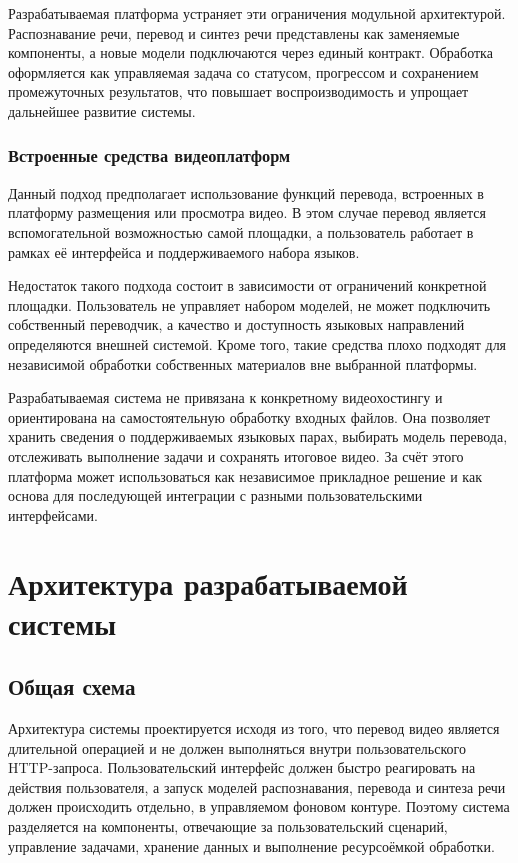 \documentclass[a4paper,article,14pt]{extarticle}
\begin{document}
Разрабатываемая платформа устраняет эти ограничения модульной архитектурой. Распознавание речи, перевод и синтез речи представлены как заменяемые компоненты, а новые модели подключаются через единый контракт. Обработка оформляется как управляемая задача со статусом, прогрессом и сохранением промежуточных результатов, что повышает воспроизводимость и упрощает дальнейшее развитие системы.

\subsubsection{Встроенные средства видеоплатформ}

Данный подход предполагает использование функций перевода, встроенных в платформу размещения или просмотра видео. В этом случае перевод является вспомогательной возможностью самой площадки, а пользователь работает в рамках её интерфейса и поддерживаемого набора языков.

Недостаток такого подхода состоит в зависимости от ограничений конкретной площадки. Пользователь не управляет набором моделей, не может подключить собственный переводчик, а качество и доступность языковых направлений определяются внешней системой. Кроме того, такие средства плохо подходят для независимой обработки собственных материалов вне выбранной платформы.

Разрабатываемая система не привязана к конкретному видеохостингу и ориентирована на самостоятельную обработку входных файлов. Она позволяет хранить сведения о поддерживаемых языковых парах, выбирать модель перевода, отслеживать выполнение задачи и сохранять итоговое видео. За счёт этого платформа может использоваться как независимое прикладное решение и как основа для последующей интеграции с разными пользовательскими интерфейсами.

\newpage
\section{Архитектура разрабатываемой системы}

\subsection{Общая схема}

Архитектура системы проектируется исходя из того, что перевод видео является длительной операцией и не должен выполняться внутри пользовательского HTTP-запроса. Пользовательский интерфейс должен быстро реагировать на действия пользователя, а запуск моделей распознавания, перевода и синтеза речи должен происходить отдельно, в управляемом фоновом контуре. Поэтому система разделяется на компоненты, отвечающие за пользовательский сценарий, управление задачами, хранение данных и выполнение ресурсоёмкой обработки.
\end{document}
